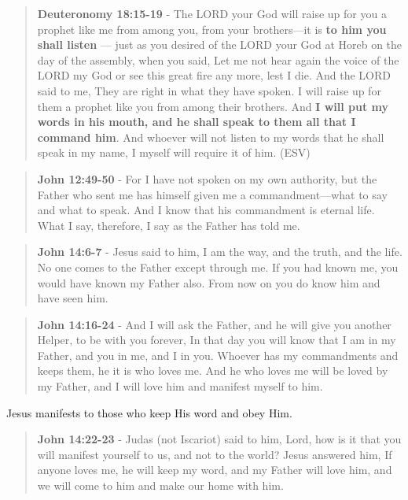 \documentclass[11pt]{article}
\begin{document}
\begin{quote}
\textbf{Deuteronomy 18:15-19} - The LORD your God will raise up for you a prophet like me from among you, from your brothers—it is \textbf{to him you shall listen} — just as you desired of the LORD your God at Horeb on the day of the assembly, when you said, Let me not hear again the voice of the LORD my God or see this great fire any more, lest I die. And the LORD said to me, They are right in what they have spoken. I will raise up for them a prophet like you from among their brothers. And \textbf{I will put my words in his mouth, and he shall speak to them all that I command him}. And whoever will not listen to my words that he shall speak in my name, I myself will require it of him. (ESV)
\end{quote}

\begin{quote}
\textbf{John 12:49-50} - For I have not spoken on my own authority, but the Father who sent me has himself given me a commandment—what to say and what to speak. And I know that his commandment is eternal life. What I say, therefore, I say as the Father has told me.
\end{quote}

\begin{quote}
\textbf{John 14:6-7} - Jesus said to him, I am the way, and the truth, and the life. No one comes to the Father except through me. If you had known me, you would have known my Father also. From now on you do know him and have seen him.
\end{quote}

\begin{quote}
\textbf{John 14:16-24} - And I will ask the Father, and he will give you another Helper, to be with you forever, In that day you will know that I am in my Father, and you in me, and I in you. Whoever has my commandments and keeps them, he it is who loves me. And he who loves me will be loved by my Father, and I will love him and manifest myself to him.
\end{quote}

Jesus manifests to those who keep His word and obey Him.

\begin{quote}
\textbf{John 14:22-23} - Judas (not Iscariot) said to him, Lord, how is it that you will manifest yourself to us, and not to the world? Jesus answered him, If anyone loves me, he will keep my word, and my Father will love him, and we will come to him and make our home with him.
\end{quote}
\end{document}
